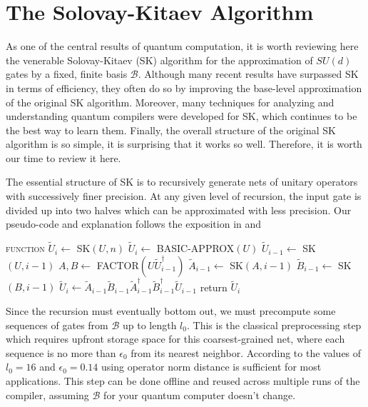 \section{The Solovay-Kitaev Algorithm}
\label{sec:qcompile-sk}

As one of the central results of quantum computation, it is worth
reviewing here the venerable Solovay-Kitaev (SK) algorithm for the
approximation of $SU(d)$ gates by a fixed, finite basis $\mathcal{B}$.
Although many recent results have surpassed SK in terms of efficiency,
they often do so by improving the base-level approximation of the
original SK algorithm. Moreover, many techniques for analyzing
and understanding quantum compilers were developed for SK, which
continues to be the best way to learn them. Finally, the overall
structure of the original SK algorithm is so simple, it is surprising
that it works so well. Therefore, it is worth
our time to review it here.

The essential structure of SK is to recursively generate nets of unitary
operators with
successively finer precision. At any given level of recursion, the input 
gate is divided up into two halves which can be
approximated with less precision. Our pseudo-code and explanation
follows the exposition in \cite{Dawson2005} and \cite{Harrow2001}

\begin{algorithmic}[1]
\STATE \textsc{function} $\tilde{U}_i \leftarrow$ SK$(U,n)$
\STATE $\tilde{U}_i \leftarrow $ BASIC-APPROX$(U)$
\ELSE
\STATE $\tilde{U}_{i-1} \leftarrow$ SK$(U, i-1)$
\STATE $A,B \leftarrow $ FACTOR$(U\tilde{U}^\dagger_{i-1})$
\STATE $\tilde{A}_{i-1} \leftarrow $ SK$(A, i-1)$
\STATE $\tilde{B}_{i-1} \leftarrow $ SK$(B, i-1)$
\STATE $\tilde{U}_i \leftarrow \tilde{A}_{i-1}\tilde{B}_{i-1}\tilde{A}^\dagger_{i-1}\tilde{B}^\dagger_{i-1}\tilde{U}_{i-1}$
\ENDIF
\STATE return $\tilde{U}_i$
\end{algorithmic}

Since the recursion must eventually bottom out, we must precompute some sequences
of gates from $\mathcal{B}$ up to length $l_0$. This is the classical
preprocessing step which requires upfront storage space for this
coarsest-grained net, where
each sequence is no more than $\epsilon_0$ from its nearest neighbor. According
to \cite{Dawson2005} the values of $l_0=16$ and $\epsilon_0 = 0.14$ using
operator norm distance is sufficient for most applications.
This step can be
done offline and reused across multiple runs of the compiler, assuming
$\mathcal{B}$ for your quantum computer doesn't change.

